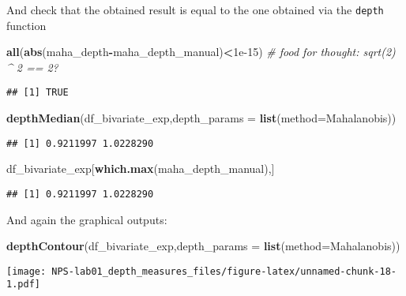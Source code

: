 \documentclass[
]{article}
\newenvironment{Shaded}{\begin{snugshade}}{\end{snugshade}}
\newcommand{\AttributeTok}[1]{\textcolor[rgb]{0.13,0.29,0.53}{#1}}
\newcommand{\CommentTok}[1]{\textcolor[rgb]{0.56,0.35,0.01}{\textit{#1}}}
\newcommand{\FloatTok}[1]{\textcolor[rgb]{0.00,0.00,0.81}{#1}}
\newcommand{\FunctionTok}[1]{\textcolor[rgb]{0.13,0.29,0.53}{\textbf{#1}}}
\newcommand{\NormalTok}[1]{#1}
\newcommand{\SpecialCharTok}[1]{\textcolor[rgb]{0.81,0.36,0.00}{\textbf{#1}}}
\newcommand{\StringTok}[1]{\textcolor[rgb]{0.31,0.60,0.02}{#1}}
\begin{document}
And check that the obtained result is equal to the one obtained via the
\texttt{depth} function

\begin{Shaded}
\begin{Highlighting}[]
\FunctionTok{all}\NormalTok{(}\FunctionTok{abs}\NormalTok{(maha\_depth}\SpecialCharTok{{-}}\NormalTok{maha\_depth\_manual)}\SpecialCharTok{\textless{}}\FloatTok{1e{-}15}\NormalTok{) }\CommentTok{\# food for thought: sqrt(2) \^{} 2 == 2?}
\end{Highlighting}
\end{Shaded}

\begin{verbatim}
## [1] TRUE
\end{verbatim}

\begin{Shaded}
\begin{Highlighting}[]
\FunctionTok{depthMedian}\NormalTok{(df\_bivariate\_exp,}\AttributeTok{depth\_params =} \FunctionTok{list}\NormalTok{(}\AttributeTok{method=}\StringTok{\textquotesingle{}Mahalanobis\textquotesingle{}}\NormalTok{))}
\end{Highlighting}
\end{Shaded}

\begin{verbatim}
## [1] 0.9211997 1.0228290
\end{verbatim}

\begin{Shaded}
\begin{Highlighting}[]
\NormalTok{df\_bivariate\_exp[}\FunctionTok{which.max}\NormalTok{(maha\_depth\_manual),]}
\end{Highlighting}
\end{Shaded}

\begin{verbatim}
## [1] 0.9211997 1.0228290
\end{verbatim}

And again the graphical outputs:

\begin{Shaded}
\begin{Highlighting}[]
\FunctionTok{depthContour}\NormalTok{(df\_bivariate\_exp,}\AttributeTok{depth\_params =} \FunctionTok{list}\NormalTok{(}\AttributeTok{method=}\StringTok{\textquotesingle{}Mahalanobis\textquotesingle{}}\NormalTok{))}
\end{Highlighting}
\end{Shaded}

\texttt{[image: NPS-lab01\_depth\_measures\_files/figure-latex/unnamed-chunk-18-1.pdf]}
\end{document}
